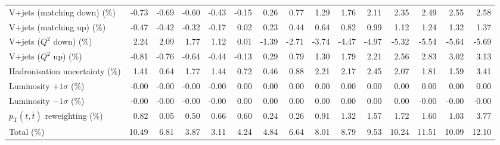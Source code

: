 \begin{table}[htbp]
{\begin{tabular}{lrrrrrrrrrrrrrr}
V+jets (matching down) (\%) & -0.73 & -0.69 & -0.60 & -0.43 & -0.15 & 0.26 & 0.77 & 1.29 & 1.76 & 2.11 & 2.35 & 2.49 & 2.55 & 2.58 \\ 
V+jets (matching up) (\%) & -0.47 & -0.42 & -0.32 & -0.17 & 0.02 & 0.23 & 0.44 & 0.64 & 0.82 & 0.99 & 1.12 & 1.24 & 1.32 & 1.37 \\ 
V+jets ($Q^{2}$ down) (\%) & 2.24 & 2.09 & 1.77 & 1.12 & 0.01 & -1.39 & -2.71 & -3.74 & -4.47 & -4.97 & -5.32 & -5.54 & -5.64 & -5.69 \\ 
V+jets ($Q^{2}$ up) (\%) & -0.81 & -0.76 & -0.64 & -0.44 & -0.13 & 0.29 & 0.79 & 1.30 & 1.79 & 2.21 & 2.56 & 2.83 & 3.02 & 3.13 \\ 
Hadronisation uncertainty (\%) & 1.41 & 0.64 & 1.77 & 1.44 & 0.72 & 0.46 & 0.88 & 2.21 & 2.17 & 2.45 & 2.07 & 1.81 & 1.59 & 3.41 \\ 
Luminosity $+1\sigma$ (\%) & -0.00 & -0.00 & -0.00 & -0.00 & 0.00 & 0.00 & 0.00 & 0.00 & 0.00 & 0.00 & 0.00 & 0.00 & 0.00 & 0.00 \\ 
Luminosity $-1\sigma$ (\%) & -0.00 & -0.00 & -0.00 & -0.00 & 0.00 & 0.00 & 0.00 & 0.00 & 0.00 & 0.00 & 0.00 & -0.00 & -0.00 & -0.00 \\ 
$p_\mathrm{T}(t,\bar{t})$ reweighting (\%) & 0.82 & 0.05 & 0.50 & 0.66 & 0.60 & 0.24 & 0.26 & 0.91 & 1.32 & 1.57 & 1.72 & 1.60 & 1.03 & 3.77 \\ 
\hline 
Total (\%) & 10.49  & 6.81  & 3.87  & 3.11  & 4.24  & 4.84  & 6.64  & 8.01  & 8.79  & 9.53  & 10.24  & 11.51  & 10.09  & 12.10 \\ 
\hline 
\end{tabular}
}
\end{table}
